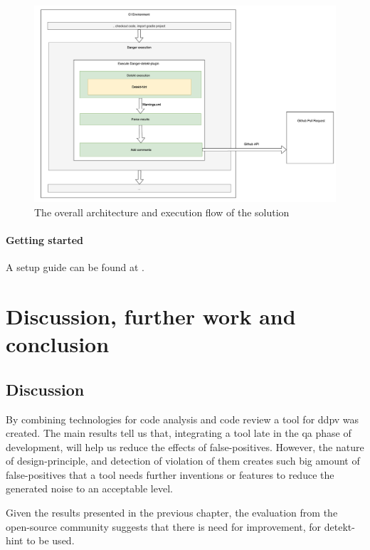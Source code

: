 \documentclass{report}
\begin{document}
\begin{figure}
    \centering
    \includegraphics[width=\textwidth]{report/images/execution-flow.png}
    \caption{The overall architecture and execution flow of the solution}
    \label{fig:integration}
\end{figure}


\subsubsection{Getting started}
A setup guide can be found at \cite{detekt-hint-repository}.




\chapter{Discussion, further work and conclusion}
\label{discussion}



\section{Discussion}
By combining technologies for code analysis and code review a tool for \gls{ddpv} was created. The main results tell us that, integrating a tool late in the \gls{qa} phase of development, will help us reduce the effects of false-positives. However, the nature of design-principle, and detection of violation of them creates such big amount of false-positives that a tool needs further inventions or features to reduce the generated noise to an acceptable level. 


Given the results presented in the previous chapter, the evaluation from the open-source community suggests that there is need for improvement, for detekt-hint to be used. 
\end{document}

